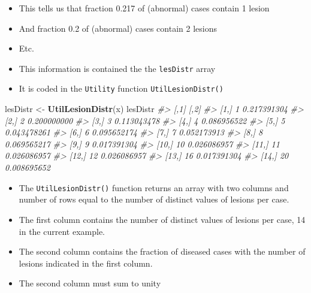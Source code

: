 \documentclass[
]{book}
\newenvironment{Shaded}{\begin{snugshade}}{\end{snugshade}}
\newcommand{\CommentTok}[1]{\textcolor[rgb]{0.56,0.35,0.01}{\textit{#1}}}
\newcommand{\KeywordTok}[1]{\textcolor[rgb]{0.13,0.29,0.53}{\textbf{#1}}}
\newcommand{\NormalTok}[1]{#1}
\newcommand{\StringTok}[1]{\textcolor[rgb]{0.31,0.60,0.02}{#1}}
\providecommand{\tightlist}{%
  \setlength{\itemsep}{0pt}\setlength{\parskip}{0pt}}
\begin{document}
\begin{itemize}
\tightlist
\item
  This tells us that fraction 0.217 of (abnormal) cases contain 1 lesion
\item
  And fraction 0.2 of (abnormal) cases contain 2 lesions
\item
  Etc.
\item
  This information is contained the the \texttt{lesDistr} array
\item
  It is coded in the \texttt{Utility} function \texttt{UtilLesionDistr()}
\end{itemize}

\begin{Shaded}
\begin{Highlighting}[]
\NormalTok{lesDistr \textless{}{-}}\StringTok{ }\KeywordTok{UtilLesionDistr}\NormalTok{(x)}
\NormalTok{lesDistr}
\CommentTok{\#\textgreater{}       [,1]        [,2]}
\CommentTok{\#\textgreater{}  [1,]    1 0.217391304}
\CommentTok{\#\textgreater{}  [2,]    2 0.200000000}
\CommentTok{\#\textgreater{}  [3,]    3 0.113043478}
\CommentTok{\#\textgreater{}  [4,]    4 0.086956522}
\CommentTok{\#\textgreater{}  [5,]    5 0.043478261}
\CommentTok{\#\textgreater{}  [6,]    6 0.095652174}
\CommentTok{\#\textgreater{}  [7,]    7 0.052173913}
\CommentTok{\#\textgreater{}  [8,]    8 0.069565217}
\CommentTok{\#\textgreater{}  [9,]    9 0.017391304}
\CommentTok{\#\textgreater{} [10,]   10 0.026086957}
\CommentTok{\#\textgreater{} [11,]   11 0.026086957}
\CommentTok{\#\textgreater{} [12,]   12 0.026086957}
\CommentTok{\#\textgreater{} [13,]   16 0.017391304}
\CommentTok{\#\textgreater{} [14,]   20 0.008695652}
\end{Highlighting}
\end{Shaded}

\begin{itemize}
\tightlist
\item
  The \texttt{UtilLesionDistr()} function returns an array with two columns and number of rows equal to the number of distinct values of lesions per case.
\item
  The first column contains the number of distinct values of lesions per case, 14 in the current example.
\item
  The second column contains the fraction of diseased cases with the number of lesions indicated in the first column.
\item
  The second column must sum to unity
\end{itemize}
\end{document}
